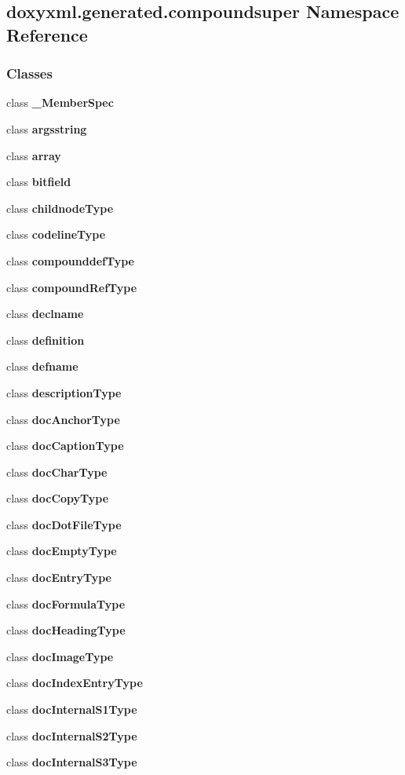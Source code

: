 \subsection{doxyxml.\+generated.\+compoundsuper Namespace Reference}
\label{namespacedoxyxml_1_1generated_1_1compoundsuper}
\subsubsection*{Classes}
\begin{DoxyCompactItemize}
\item 
class {\bf \+\_\+\+Member\+Spec}
\item 
class {\bf argsstring}
\item 
class {\bf array}
\item 
class {\bf bitfield}
\item 
class {\bf childnode\+Type}
\item 
class {\bf codeline\+Type}
\item 
class {\bf compounddef\+Type}
\item 
class {\bf compound\+Ref\+Type}
\item 
class {\bf declname}
\item 
class {\bf definition}
\item 
class {\bf defname}
\item 
class {\bf description\+Type}
\item 
class {\bf doc\+Anchor\+Type}
\item 
class {\bf doc\+Caption\+Type}
\item 
class {\bf doc\+Char\+Type}
\item 
class {\bf doc\+Copy\+Type}
\item 
class {\bf doc\+Dot\+File\+Type}
\item 
class {\bf doc\+Empty\+Type}
\item 
class {\bf doc\+Entry\+Type}
\item 
class {\bf doc\+Formula\+Type}
\item 
class {\bf doc\+Heading\+Type}
\item 
class {\bf doc\+Image\+Type}
\item 
class {\bf doc\+Index\+Entry\+Type}
\item 
class {\bf doc\+Internal\+S1\+Type}
\item 
class {\bf doc\+Internal\+S2\+Type}
\item 
class {\bf doc\+Internal\+S3\+Type}
\item 

\end{DoxyCompactItemize}
